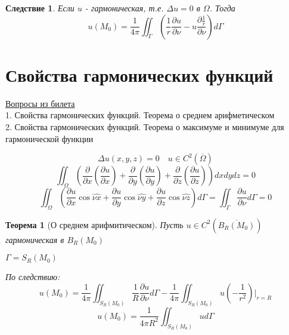 \documentclass[a4paper]{article}
\newtheorem*{theorem}{Теорема}
\newtheorem*{consequence}{Следствие}
\theoremstyle{definition}
\theoremstyle{remark}
\begin{document}
\begin{tcolorbox}
    \begin{consequence}
        Если $ u $ - гармоническая, т.е. $ \Delta u = 0 $ в $ \Omega $. Тогда
        \begin{equation}
            u(M_0) = \frac{1}{4\pi} \iint_{\Gamma}\left(\frac{1}{r} \frac{\partial u}{\partial \nu} -
              u \frac{\partial \frac{1}{r} }{\partial \nu} \right) d\Gamma 
        \end{equation}
    \end{consequence}
\end{tcolorbox}

\section*{\centering Свойства гармонических функций}

\begin{tcolorbox}
    \underline{Вопросы из билета}\\
    1. Свойства гармонических функций. Теорема о среднем арифметическом\\
    2. Свойства гармонических функций. Теорема о максимуме и минимуме для
    гармонической функции
\end{tcolorbox}
\begin{equation}
    \Delta u(x,y,z) = 0 \quad u \in C^2(\overline{\Omega})
\end{equation}
\[
    \iint_{\Omega} \left(\frac{\partial}{\partial x} \left(\frac{\partial u}{\partial x}\right) 
    +\frac{\partial}{\partial y} \left(\frac{\partial u}{\partial y}\right)
    +\frac{\partial}{\partial z} \left(\frac{\partial u}{\partial z}\right)\right)
    dxdydz
    = 0
\]
\[
    \iint_{\Omega} \left(\frac{\partial u}{\partial x} \cos \widehat{\nu x} 
    +\frac{\partial u}{\partial y} \cos \widehat{\nu y}
    +\frac{\partial u}{\partial z} \cos \widehat{\nu z}\right)
    d \Gamma = \iint_{\Gamma}\frac{\partial u}{\partial \nu} d\Gamma = 0
\]
\begin{tcolorbox}
    \begin{theorem}[О среднем арифмитическом]
        Пусть $ u \in C^2(\overline{B_R(M_0)}) $ гармоническая в $ B_R(M_0) $ 

        $ \Gamma = S_{R}(M_0) $ 

        По следствию:
        \[
            u(M_0) = \frac{1}{4\pi} \iint_{S_R(M_0)} \frac{1}{R} \frac{\partial u}{\partial \nu} 
            d\Gamma - \frac{1}{4\pi} \iint_{S_R(M_0)}u \left(-\frac{1}{r^2} \right)
            \bigg|_{r=R} 
        \]
        \begin{equation}
            u(M_0) = \frac{1}{4 \pi R^2}  \iint_{S_R(M_0)} u d\Gamma
        \end{equation}
    \end{theorem}
\end{tcolorbox}
\end{document}
